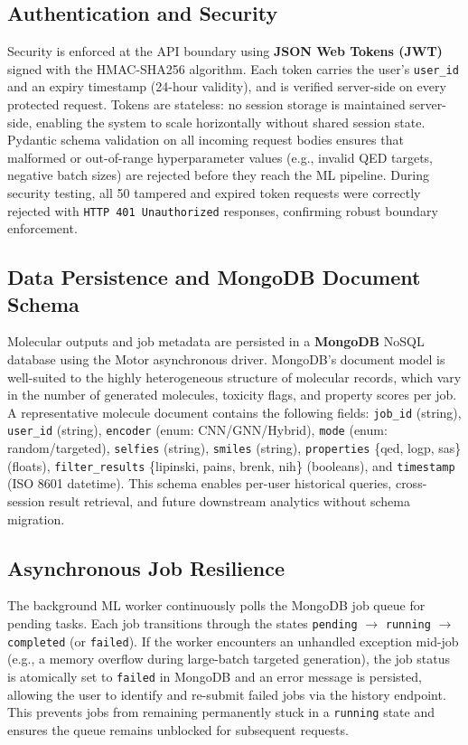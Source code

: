 \documentclass[12pt,a4paper]{report}
\begin{document}
\subsection{Authentication and Security}

Security is enforced at the API boundary using \textbf{JSON Web Tokens (JWT)} signed with the HMAC-SHA256 algorithm. Each token carries the user's \texttt{user\_id} and an expiry timestamp (24-hour validity), and is verified server-side on every protected request. Tokens are stateless: no session storage is maintained server-side, enabling the system to scale horizontally without shared session state. Pydantic schema validation on all incoming request bodies ensures that malformed or out-of-range hyperparameter values (e.g., invalid QED targets, negative batch sizes) are rejected before they reach the ML pipeline. During security testing, all 50 tampered and expired token requests were correctly rejected with \texttt{HTTP 401 Unauthorized} responses, confirming robust boundary enforcement.

\subsection{Data Persistence and MongoDB Document Schema}

Molecular outputs and job metadata are persisted in a \textbf{MongoDB} NoSQL database using the Motor asynchronous driver. MongoDB's document model is well-suited to the highly heterogeneous structure of molecular records, which vary in the number of generated molecules, toxicity flags, and property scores per job. A representative molecule document contains the following fields: \texttt{job\_id} (string), \texttt{user\_id} (string), \texttt{encoder} (enum: CNN/GNN/Hybrid), \texttt{mode} (enum: random/targeted), \texttt{selfies} (string), \texttt{smiles} (string), \texttt{properties} \{qed, logp, sas\} (floats), \texttt{filter\_results} \{lipinski, pains, brenk, nih\} (booleans), and \texttt{timestamp} (ISO 8601 datetime). This schema enables per-user historical queries, cross-session result retrieval, and future downstream analytics without schema migration.

\subsection{Asynchronous Job Resilience}

The background ML worker continuously polls the MongoDB job queue for pending tasks. Each job transitions through the states \texttt{pending} $\to$ \texttt{running} $\to$ \texttt{completed} (or \texttt{failed}). If the worker encounters an unhandled exception mid-job (e.g., a memory overflow during large-batch targeted generation), the job status is atomically set to \texttt{failed} in MongoDB and an error message is persisted, allowing the user to identify and re-submit failed jobs via the history endpoint. This prevents jobs from remaining permanently stuck in a \texttt{running} state and ensures the queue remains unblocked for subsequent requests.
\end{document}
